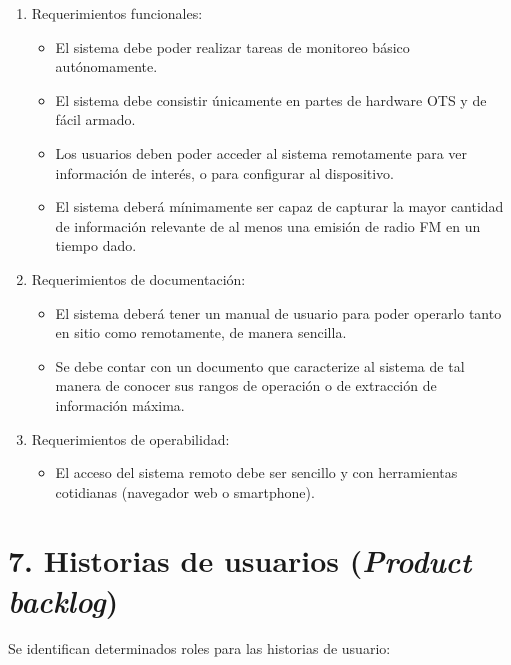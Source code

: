 \documentclass[
11pt, %
codirector, %
]{charter}
\begin{document}
\begin{enumerate}
	\item Requerimientos funcionales:
		\begin{itemize}
			\item El sistema debe poder realizar tareas de monitoreo básico 		autónomamente.
			\item El sistema debe consistir únicamente en partes de hardware OTS y de fácil armado.
			\item Los usuarios deben poder acceder al sistema remotamente para ver información de interés, o para configurar al dispositivo.
			\item El sistema deberá mínimamente ser capaz de capturar la mayor cantidad de información relevante de al menos una emisión de radio FM en un tiempo dado.
		\end{itemize}
	\item Requerimientos de documentación:
		\begin{itemize}
			\item El sistema deberá tener un manual de usuario para poder operarlo tanto en sitio como remotamente, de manera sencilla.
			\item Se debe contar con un documento que caracterize al sistema de tal manera de conocer sus rangos de operación o de extracción de información máxima.
		\end{itemize}
	\item Requerimientos de operabilidad:
		\begin{itemize}
			\item El acceso del sistema remoto debe ser sencillo y con herramientas cotidianas (navegador web o smartphone).
		\end{itemize}
\end{enumerate}

\section{7. Historias de usuarios (\textit{Product backlog})}
\label{sec:backlog}

Se identifican determinados roles para las historias de usuario:
\end{document}
